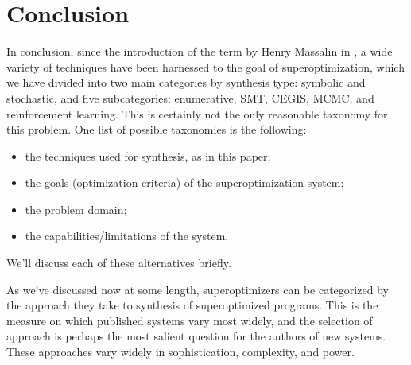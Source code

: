 \documentclass[12pt,twoside]{reedthesis}
\newcommand{\red}[1]{\textcolor{red}{#1}}
\begin{document}
\chapter{Conclusion}
    
    In conclusion,
        since the introduction of the term by Henry Massalin in \cite{massalin1987superoptimizer},
        a wide variety of techniques have been harnessed to the goal of superoptimization,
        which we have divided into two main categories by synthesis type:
            symbolic and stochastic,
        and five subcategories:
            enumerative, SMT, CEGIS, MCMC, and reinforcement learning.
    This is certainly not the only reasonable taxonomy for this problem.
    One list of possible taxonomies is the following:
        \begin{itemize}
            \item the techniques used for synthesis, as in this paper;
            \item the goals (optimization criteria) of the superoptimization system;
            \item the problem domain;
            \item the capabilities/limitations of the system.
        \end{itemize}
    We'll discuss each of these alternatives briefly.
    
    As we've discussed now at some length, superoptimizers can be categorized by the approach they take to synthesis of superoptimized programs.
    This is the measure on which published systems vary most widely, and the selection of approach is perhaps the most salient question for the authors of new systems.
    These approaches vary widely in sophistication, complexity, and power.
    
\end{document}
